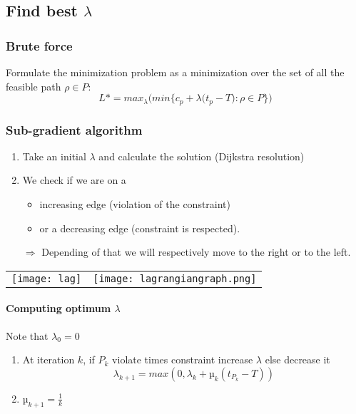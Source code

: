 \subsection{Find best $\lambda$}

\subsubsection{Brute force}
Formulate the minimization problem as a minimization over the set of all 
the feasible path $\rho \in P$:
$$L* = max_{\lambda} \Bigg( min \{ c_{p} + \lambda\big(t_p - T): \rho
    \in P \}\Bigg)$$

\subsubsection{Sub-gradient algorithm}

\begin{enumerate}
    \item Take an initial $\lambda$ and calculate the solution (Dijkstra resolution)
    \item We check if we are on a 
        \begin{itemize}
            \item increasing edge (violation of the constraint) 
            \item or a decreasing edge (constraint is respected). 
        \end{itemize}

        $\Rightarrow$ Depending of that we will respectively move to
        the right or to the left.
\end{enumerate}

\begin{tabular}{m{9cm}m{9cm}}
    \texttt{[image: lag]}
    &
    \texttt{[image: lagrangiangraph.png]}
\end{tabular}



\paragraph{Computing optimum $\lambda$}
Note that $\lambda_0 = 0$
\begin{enumerate}
    \item At iteration $k$, if $P_k$ violate times constraint increase
        $\lambda$ else decrease it 
        $$\lambda_{k+1} = max(0, \lambda_k + µ_k(t_{P_k} - T))$$

    \item $µ_{k+1} = \frac{1}{k}$
\end{enumerate}

